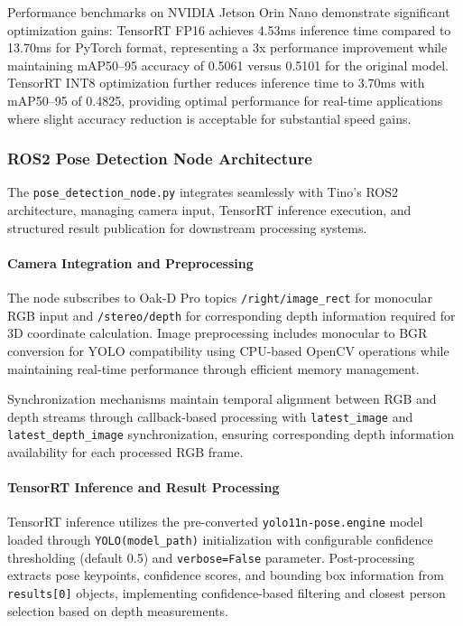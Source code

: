 Performance benchmarks on NVIDIA Jetson Orin Nano demonstrate significant optimization gains: TensorRT FP16 achieves 4.53ms inference time compared to 13.70ms for PyTorch format, representing a 3x performance improvement while maintaining mAP50--95 accuracy of 0.5061 versus 0.5101 for the original model. TensorRT INT8 optimization further reduces inference time to 3.70ms with mAP50--95 of 0.4825, providing optimal performance for real-time applications where slight accuracy reduction is acceptable for substantial speed gains.

\subsubsection{ROS2 Pose Detection Node Architecture}

The \texttt{pose\_detection\_node.py} integrates seamlessly with Tino's ROS2 architecture, managing camera input, TensorRT inference execution, and structured result publication for downstream processing systems.

\paragraph{Camera Integration and Preprocessing}

The node subscribes to Oak-D Pro topics \texttt{/right/image\_rect} for monocular RGB input and \texttt{/stereo/depth} for corresponding depth information required for 3D coordinate calculation. Image preprocessing includes monocular to BGR conversion for YOLO compatibility using CPU-based OpenCV operations while maintaining real-time performance through efficient memory management.

Synchronization mechanisms maintain temporal alignment between RGB and depth streams through callback-based processing with \texttt{latest\_image} and \texttt{latest\_depth\_image} synchronization, ensuring corresponding depth information availability for each processed RGB frame.

\paragraph{TensorRT Inference and Result Processing}

TensorRT inference utilizes the pre-converted \texttt{yolo11n-pose.engine} model loaded through \texttt{YOLO(model\_path)} initialization with configurable confidence thresholding (default 0.5) and \texttt{verbose=False} parameter. Post-processing extracts pose keypoints, confidence scores, and bounding box information from \texttt{results[0]} objects, implementing confidence-based filtering and closest person selection based on depth measurements.

